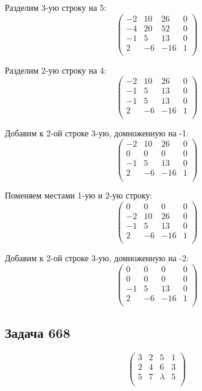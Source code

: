 	 Разделим 3-ую строку на 5:
	 \[
	 \begin{pmatrix}
	 -2 & 10 & 26 & 0 \\
	 -4 & 20 & 52 & 0 \\
	 -1 & 5 & 13 & 0 \\
	 2 & -6 & -16 & 1 \\
	 \end{pmatrix}
	 \]
	 
	 Разделим 2-ую строку на 4:
	 \[
	 \begin{pmatrix}
	 -2 & 10 & 26 & 0 \\
	 -1 & 5 & 13 & 0 \\
	 -1 & 5 & 13 & 0 \\
	 2 & -6 & -16 & 1 \\
	 \end{pmatrix}
	 \]
	 
	 Добавим к 2-ой строке 3-ую, домноженную на -1:
	 \[
	 \begin{pmatrix}
	 -2 & 10 & 26 & 0 \\
	 0 & 0 & 0 & 0 \\
	 -1 & 5 & 13 & 0 \\
	 2 & -6 & -16 & 1 \\
	 \end{pmatrix}
	 \]
	 
	 Поменяем местами 1-ую и 2-ую строку:
	 \[
	 \begin{pmatrix}
	 0 & 0 & 0 & 0 \\
	 -2 & 10 & 26 & 0 \\
	 -1 & 5 & 13 & 0 \\
	 2 & -6 & -16 & 1 \\
	 \end{pmatrix}
	 \]
	 
	 Добавим к 2-ой строке 3-ую, домноженную на -2:
	 \[
	 \begin{pmatrix}
	 0 & 0 & 0 & 0 \\
	 0 & 0 & 0 & 0 \\
	 -1 & 5 & 13 & 0 \\
	 2 & -6 & -16 & 1 \\
	 \end{pmatrix}
	 \]
	 
	  \subsection{Задача 668}
	 
	 \[
	 \begin{pmatrix}
	 3 & 2 & 5 & 1 \\
	 2 & 4 & 6 & 3 \\
	 5 & 7 & \lambda & 5 \\
	 \end{pmatrix}
	 \]
	 
